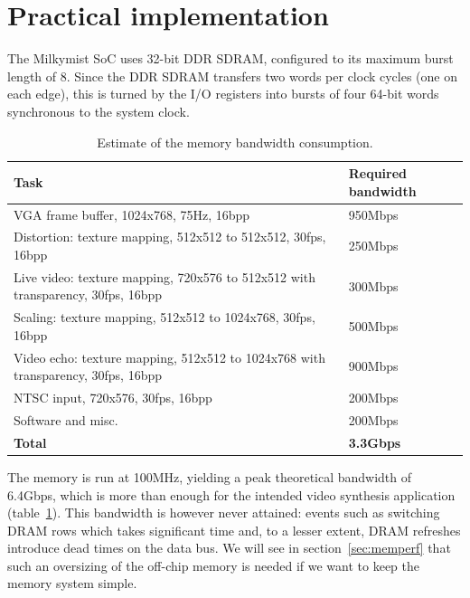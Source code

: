 \documentclass[a4paper,11pt]{kthesis}
\begin{document}
\section{Practical implementation}
\label{sec:memimpl}
The Milkymist SoC uses 32-bit DDR SDRAM, configured to its maximum burst length of 8. Since the DDR SDRAM transfers two words per clock cycles (one on each edge), this is turned by the I/O registers into bursts of four 64-bit words synchronous to the system clock.

\begin{table}
\centering
\begin{tabularx}{13cm}{|X|l|}
\hline
\textbf{Task} & \textbf{Required bandwidth} \\
\hline
VGA frame buffer, 1024x768, 75Hz, 16bpp & 950Mbps \\
\hline
Distortion: texture mapping, 512x512 to 512x512, 30fps, 16bpp & 250Mbps \\
\hline
Live video: texture mapping, 720x576 to 512x512 with transparency, 30fps, 16bpp & 300Mbps \\
\hline
Scaling: texture mapping, 512x512 to 1024x768, 30fps, 16bpp & 500Mbps \\
\hline
Video echo: texture mapping, 512x512 to 1024x768 with transparency, 30fps, 16bpp & 900Mbps \\
\hline
NTSC input, 720x576, 30fps, 16bpp & 200Mbps \\
\hline
Software and misc. & 200Mbps \\
\hline
\textbf{Total} & \textbf{3.3Gbps} \\
\hline
\end{tabularx}
\caption{Estimate of the memory bandwidth consumption.}\label{tab:membw}
\end{table}

The memory is run at 100MHz, yielding a peak theoretical bandwidth of 6.4Gbps, which is more than enough for the intended video synthesis application (table~\ref{tab:membw}). This bandwidth is however never attained: events such as switching DRAM rows which takes significant time and, to a lesser extent, DRAM refreshes introduce dead times on the data bus. We will see in section~\ref{sec:memperf} that such an oversizing of the off-chip memory is needed if we want to keep the memory system simple.
\end{document}
